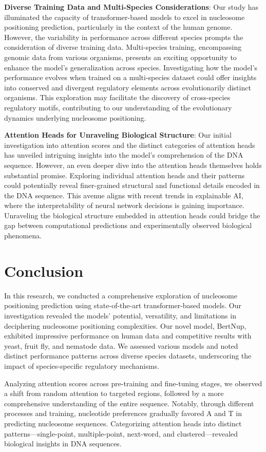 \documentclass[a4paper,fleqn]{cas-dc}
\begin{document}
\textbf{Diverse Training Data and Multi-Species Considerations}: Our study has illuminated the capacity of transformer-based models to excel in nucleosome positioning prediction, particularly in the context of the human genome. However, the variability in performance across different species prompts the consideration of diverse training data. Multi-species training, encompassing genomic data from various organisms, presents an exciting opportunity to enhance the model's generalization across species. Investigating how the model's performance evolves when trained on a multi-species dataset could offer insights into conserved and divergent regulatory elements across evolutionarily distinct organisms. This exploration may facilitate the discovery of cross-species regulatory motifs, contributing to our understanding of the evolutionary dynamics underlying nucleosome positioning.

\textbf{Attention Heads for Unraveling Biological Structure}: Our initial investigation into attention scores and the distinct categories of attention heads has unveiled intriguing insights into the model's comprehension of the DNA sequence. However, an even deeper dive into the attention heads themselves holds substantial promise. Exploring individual attention heads and their patterns could potentially reveal finer-grained structural and functional details encoded in the DNA sequence. This avenue aligns with recent trends in explainable AI, where the interpretability of neural network decisions is gaining importance. Unraveling the biological structure embedded in attention heads could bridge the gap between computational predictions and experimentally observed biological phenomena.


\section{Conclusion}
In this research, we conducted a comprehensive exploration of nucleosome positioning prediction using state-of-the-art transformer-based models. Our investigation revealed the models' potential, versatility, and limitations in deciphering nucleosome positioning complexities. Our novel model, BertNup, exhibited impressive performance on human data and competitive results with yeast, fruit fly, and nematode data. We assessed various models and noted distinct performance patterns across diverse species datasets, underscoring the impact of species-specific regulatory mechanisms.

Analyzing attention scores across pre-training and fine-tuning stages, we observed a shift from random attention to targeted regions, followed by a more comprehensive understanding of the entire sequence. Notably, through different processes and training, nucleotide preferences gradually favored A and T in predicting nucleosome sequences. Categorizing attention heads into distinct patterns—single-point, multiple-point, next-word, and clustered—revealed biological insights in DNA sequences.
\end{document}
